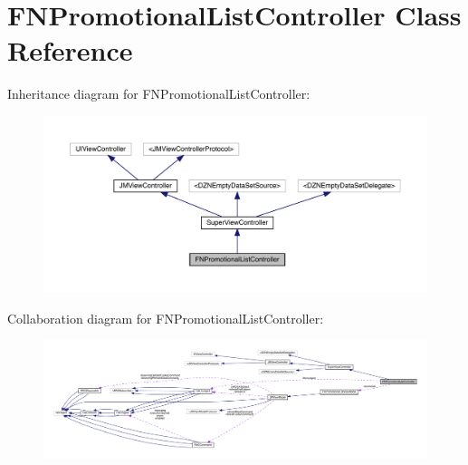 \hypertarget{interface_f_n_promotional_list_controller}{}\section{F\+N\+Promotional\+List\+Controller Class Reference}
\label{interface_f_n_promotional_list_controller}


Inheritance diagram for F\+N\+Promotional\+List\+Controller\+:\nopagebreak
\begin{figure}[H]
\begin{center}
\leavevmode
\includegraphics[width=350pt]{interface_f_n_promotional_list_controller__inherit__graph}
\end{center}
\end{figure}


Collaboration diagram for F\+N\+Promotional\+List\+Controller\+:\nopagebreak
\begin{figure}[H]
\begin{center}
\leavevmode
\includegraphics[width=350pt]{interface_f_n_promotional_list_controller__coll__graph}
\end{center}
\end{figure}
